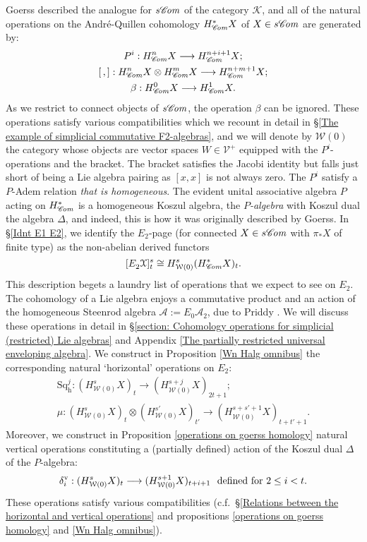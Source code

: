 \documentclass[11pt]{amsart} \renewcommand{\baselinestretch}{1.2}
\theoremstyle{plain}
\numberwithin{equation}{section} %
\theoremstyle{plain}
\numberwithin{equation}{chapter} %
\renewcommand{\to}{\longrightarrow}
\newcommand{\scrC}{\mathscr{C}}
\newcommand{\calA}{\mathcal{A}}
\newcommand{\calV}{\mathcal{V}}
\newcommand{\calw}{\mathcal{W}}
\newcommand{\cala}{\mathcal{A}}
\newcommand{\calk}{\mathcal{K}}
\newcommand{\calx}{\mathcal{X}}
\newcommand{\vect}[2]{\calV^{#1}_{#2}}
\newcommand{\LieSteen}{\calA}
\newcommand{\algs}{{\scrC\!\textit{\normalfont\textit{om}}}}
\newcommand{\E}[5]{[E^{#1}_{#2}#3]^{#4}_{#5}}
\newcommand{\uver}{^\mathrm{v}}
\newcommand{\dhor}{_\mathrm{h}}
\newcommand{\Sqh}{\mathrm{Sq}\dhor}
\newcommand{\deltav}{\delta\uver}
\begin{document}
\begin{Introduction}
Goerss \cite{MR1089001} described the analogue for $s\algs$ of the category $\calk$, and  all of the natural operations on the Andr\'e-Quillen cohomology $H^*_\algs X$ of $X\in s\algs$ are generated by:
\begin{gather*}
P^i:H^n_{\algs}X\to H_{\algs}^{n+i+1}X;\\
[\,,]:H_{\algs}^nX\otimes H_{\algs}^mX\to H_{\algs}^{n+m+1}X;\\
\beta:H^0_{\algs}X\to H_{\algs}^{1}X.
\end{gather*}
As we restrict to connect objects of $s\algs$, the operation $\beta$ can be ignored.
These operations satisfy various compatibilities which we recount in detail in \S\ref{The example of simplicial commutative F2-algebras}, and we will denote by $\calw(0)$ the category whose objects are vector spaces $W\in\vect{+}{}$ equipped with the $P^i$-operations and the bracket.
The bracket satisfies the Jacobi identity but falls just short of being a Lie algebra pairing as $[x,x]$ is not always zero. The $P^i$ satisfy a $P$-Adem relation \emph{that is homogeneous}. The evident unital associative algebra $P$ acting on $H^{*}_{\algs}$ is a homogeneous Koszul algebra, the \emph{$P$-algebra} with Koszul dual the algebra $\Delta$, and indeed, this is how it was originally described by Goerss. In \S\ref{Idnt E1 E2}, we identify the $E_2$-page (for connected $X\in s\algs$ with $\pi_*X$ of finite type) as the  non-abelian derived functors
\[\E{}{2}{\calx}{s}{t}\cong H^{s}_{\calw(0)}(H^{*}_{\algs}X)_t.\]
This description begets a laundry list of operations that we expect to see on $E_2$. The cohomology of a Lie algebra enjoys a commutative product and an action of the homogeneous Steenrod algebra $\LieSteen:=E_0\cala_2$, due to Priddy \cite{PriddySimplicialLie.pdf}. We will discuss these operations in detail in \S\ref{section: Cohomology operations for simplicial (restricted) Lie algebras} and Appendix \ref{The partially restricted universal enveloping algebra}. %
We construct in Proposition \ref{Wn Halg omnibus} the corresponding natural `horizontal' operations on $E_2$:
\begin{gather*}
\Sqh^j:(H^s_{\calw(0)}X)_t\to (H^{s+j}_{\calw(0)}X)_{2t+1};\\
\mu:(H^s_{\calw(0)}X)_t\otimes (H^{s'}_{\calw(0)}X)_{t'}\to (H^{s+s'+1}_{\calw(0)}X)_{t+t'+1}.
\end{gather*}
Moreover, we construct in Proposition \ref{operations on goerss homology} natural vertical operations constituting a  (partially defined) action of the Koszul dual $\Delta$ of the $P$-algebra:
\[\deltav_i:(H^s_{\calw(0)}X)_t\to (H^{s+1}_{\calw(0)}X)_{t+i+1}\textup{ \ defined for $2\leq i <t$}.\]%
These operations satisfy various compatibilities (c.f.\ \S\ref{Relations between the horizontal and vertical operations} and propositions \ref{operations on goerss homology} and \ref{Wn Halg omnibus}).


\end{Introduction}
\end{document}
